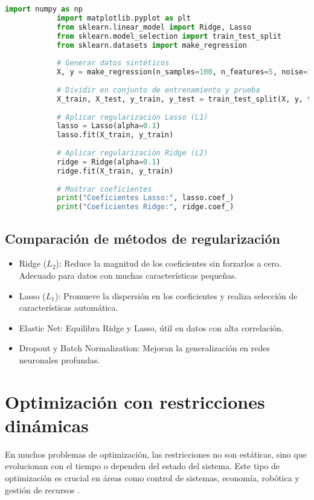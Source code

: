 \begin{itemize}
		\begin{lstlisting}[language=Python, caption={Regularización en regresión logística en Python}]
			import numpy as np
			import matplotlib.pyplot as plt
			from sklearn.linear_model import Ridge, Lasso
			from sklearn.model_selection import train_test_split
			from sklearn.datasets import make_regression
			
			# Generar datos sintéticos
			X, y = make_regression(n_samples=100, n_features=5, noise=10, random_state=42)
			
			# Dividir en conjunto de entrenamiento y prueba
			X_train, X_test, y_train, y_test = train_test_split(X, y, test_size=0.2, random_state=42)
			
			# Aplicar regularización Lasso (L1)
			lasso = Lasso(alpha=0.1)
			lasso.fit(X_train, y_train)
			
			# Aplicar regularización Ridge (L2)
			ridge = Ridge(alpha=0.1)
			ridge.fit(X_train, y_train)
			
			# Mostrar coeficientes
			print("Coeficientes Lasso:", lasso.coef_)
			print("Coeficientes Ridge:", ridge.coef_)
		\end{lstlisting}
		
		\subsection{Comparación de métodos de regularización}
		
		\begin{itemize}
			\item Ridge (\( L_2 \)): Reduce la magnitud de los coeficientes sin forzarlos a cero. Adecuado para datos con muchas características pequeñas.
			\item Lasso (\( L_1 \)): Promueve la dispersión en los coeficientes y realiza selección de características automática.
			\item Elastic Net: Equilibra Ridge y Lasso, útil en datos con alta correlación.
			\item Dropout y Batch Normalization: Mejoran la generalización en redes neuronales profundas.
		\end{itemize}
		\section{Optimización con restricciones dinámicas}
		
		En muchos problemas de optimización, las restricciones no son estáticas, sino que evolucionan con el tiempo o dependen del estado del sistema. Este tipo de optimización es crucial en áreas como control de sistemas, economía, robótica y gestión de recursos \cite{bertsekas1995dynamic}.
		

\end{itemize}
